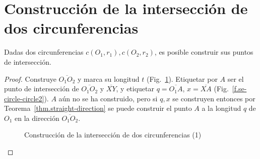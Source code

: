 \section{Construcción de la intersección de dos circunferencias}\label{s.two-circles}

\begin{theorem}
Dadas dos circunferencias $c(O_1,r_1), c(O_2,r_2)$, es posible construir sus puntos de intersección.
\end{theorem}

\begin{proof}
Construye $\overline{O_1O_2}$ y marca su longitud $t$ (Fig.~\ref{f.se-circle-circle1}).
Etiquetar por $A$ ser el punto de intersección de $\overline{O_1O_2}$ y $\overline{XY}$, y etiquetar $q=\overline{O_1A}$, $x=\overline{XA}$ (Fig.~\ref{f.se-circle-circle2}). $A$ aún no se ha construido, pero si $q,x$ se construyen entonces por Teorema~\ref{thm.straight-direction} se puede construir el punto $A$ a la longitud $q$ de $O_1$ en la dirección $\overline{O_1O_2}$.

\begin{figure}[t]
\begin{center}
\end{center}
\caption{Construcción de la intersección de dos circunferencias (1)}\label{f.se-circle-circle1}
\end{figure}


\end{proof}
